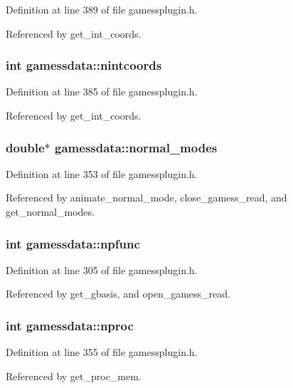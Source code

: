 Definition at line 389 of file gamessplugin.h.

Referenced by get\_\-int\_\-coords.
\subsubsection{\setlength{\rightskip}{0pt plus 5cm}int gamessdata::nintcoords}\label{structgamessdata_m39}




Definition at line 385 of file gamessplugin.h.

Referenced by get\_\-int\_\-coords.
\subsubsection{\setlength{\rightskip}{0pt plus 5cm}double$\ast$ gamessdata::normal\_\-modes}\label{structgamessdata_m30}




Definition at line 353 of file gamessplugin.h.

Referenced by animate\_\-normal\_\-mode, close\_\-gamess\_\-read, and get\_\-normal\_\-modes.
\subsubsection{\setlength{\rightskip}{0pt plus 5cm}int gamessdata::npfunc}\label{structgamessdata_m7}




Definition at line 305 of file gamessplugin.h.

Referenced by get\_\-gbasis, and open\_\-gamess\_\-read.
\subsubsection{\setlength{\rightskip}{0pt plus 5cm}int gamessdata::nproc}\label{structgamessdata_m31}




Definition at line 355 of file gamessplugin.h.

Referenced by get\_\-proc\_\-mem.
